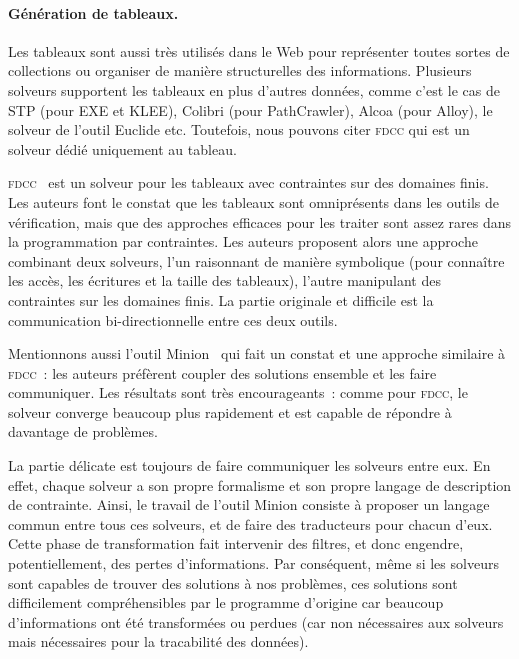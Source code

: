 \paragraph{Génération de tableaux.} Les tableaux sont aussi très utilisés dans
le Web pour représenter toutes sortes de collections ou organiser de manière
structurelles des informations. Plusieurs solveurs supportent les tableaux en
plus d'autres données, comme c'est le cas de STP (pour EXE et KLEE), Colibri
(pour PathCrawler), Alcoa (pour Alloy), le solveur de l'outil Euclide etc.
Toutefois, nous pouvons citer {\scshape fdcc} qui est un solveur dédié
uniquement au tableau.

{\scshape fdcc}~ est un solveur pour les tableaux avec
contraintes sur des domaines finis. Les auteurs font le constat que les tableaux
sont omniprésents dans les outils de vérification, mais que des approches
efficaces pour les traiter sont assez rares dans la programmation par
contraintes. Les auteurs proposent alors une approche combinant deux solveurs,
l'un raisonnant de manière symbolique (pour connaître les accès, les écritures
et la taille des tableaux), l'autre manipulant des contraintes sur les domaines
finis. La partie originale et difficile est la communication bi-directionnelle
entre ces deux outils.

Mentionnons aussi l'outil Minion~ qui fait un constat et une
approche similaire à {\scshape fdcc}~: les auteurs préfèrent coupler des
solutions ensemble et les faire communiquer. Les résultats sont très
encourageants~: comme pour {\scshape fdcc}, le solveur converge beaucoup plus
rapidement et est capable de répondre à davantage de problèmes.

La partie délicate est toujours de faire communiquer les solveurs entre eux. En
effet, chaque solveur a son propre formalisme et son propre langage de
description de contrainte. Ainsi, le travail de l'outil Minion consiste à
proposer un langage commun entre tous ces solveurs, et de faire des traducteurs
pour chacun d'eux. Cette phase de transformation fait intervenir des filtres, et
donc engendre, potentiellement, des pertes d'informations. Par conséquent, même
si les solveurs sont capables de trouver des solutions à nos problèmes, ces
solutions sont difficilement compréhensibles par le programme d'origine car
beaucoup d'informations ont été transformées ou perdues (car non nécessaires aux
solveurs mais nécessaires pour la tracabilité des données).
